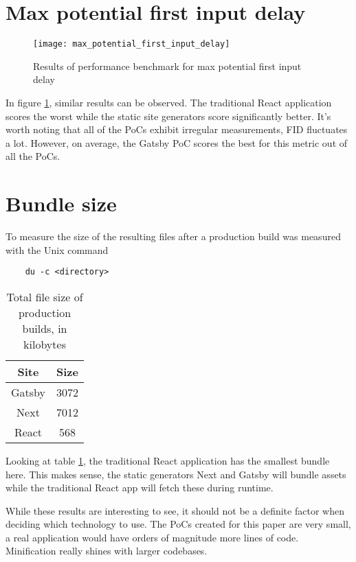 \section{Max potential first input delay}

\begin{figure}[htb!]
	\texttt{[image: max\_potential\_first\_input\_delay]}
	\caption{Results of performance benchmark for max potential first input delay}
	\label{fig:max_potential_first_input_delay}
\end{figure}

In figure \ref{fig:max_potential_first_input_delay}, similar results can be observed. 
The traditional React application scores the worst while the static site generators score significantly better.
It's worth noting that all of the PoCs exhibit irregular measurements, FID fluctuates a lot.
However, on average, the Gatsby PoC scores the best for this metric out of all the PoCs.

\section{Bundle size}

To measure the size of the resulting files after a production build was measured with the Unix command 

\begin{verbatim}
	du -c <directory>
\end{verbatim}

\begin{table}[htb!]
	\begin{center}
		\begin{tabular}{||c c||} 
			\hline
			Site   & Size \\ [0.5ex] 
			\hline\hline
			Gatsby & 3072 \\ 
			\hline
			Next   & 7012 \\
			\hline
			React  & 568  \\[1ex] 
			\hline
		\end{tabular}
		\caption{Total file size of production builds, in kilobytes }
		\label{tbl:bundle_size}
	\end{center}
\end{table}

Looking at table \ref{tbl:bundle_size}, the traditional React application has the smallest bundle here. 
This makes sense, the static generators Next and Gatsby will bundle assets while the traditional React app will fetch these during runtime.

While these results are interesting to see, it should not be a definite factor when deciding which technology to use.
The PoCs created for this paper are very small, a real application would have orders of magnitude more lines of code.
Minification really shines with larger codebases. 